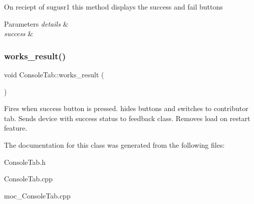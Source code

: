 On reciept of sugusr1 this method displays the success and fail buttons 
\begin{DoxyParams}{Parameters}
{\em details} & \\
\hline
{\em success} & \\
\hline
\end{DoxyParams}
\mbox{\label{classConsoleTab_a866367073a3150527988f7cb841d5002}} 
\subsubsection{\texorpdfstring{works\+\_\+result()}{works\_result()}}
{\footnotesize\ttfamily void Console\+Tab\+::works\+\_\+result (\begin{DoxyParamCaption}{ }\end{DoxyParamCaption})}

Fires when success button is pressed. hides buttons and switches to contributor tab. Sends device with success status to feedback class. Removes load on restart feature. 

The documentation for this class was generated from the following files\+:\begin{DoxyCompactItemize}
\item 
Console\+Tab.\+h\item 
Console\+Tab.\+cpp\item 
moc\+\_\+\+Console\+Tab.\+cpp\end{DoxyCompactItemize}
